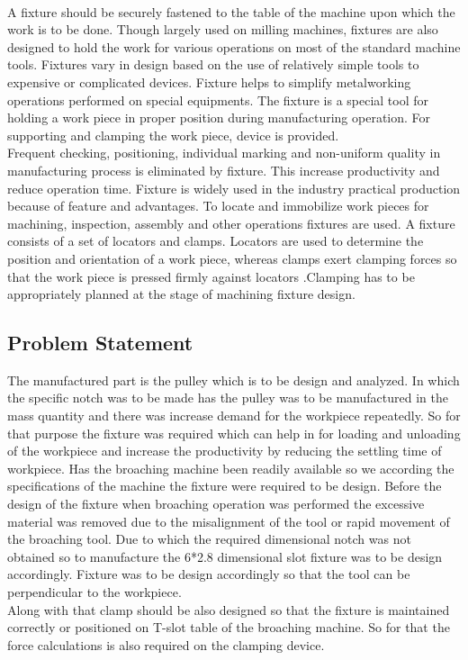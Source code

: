 \documentclass[16pt,a4paper]{article}
\begin{document}
\\ A fixture should be securely fastened to the table of the machine upon which the work is to be done. Though largely used on milling machines, fixtures are also designed to hold the work for various operations on most of the standard machine tools. Fixtures vary in design based on the use of relatively simple tools to expensive or complicated devices. Fixture helps to simplify metalworking operations performed on special equipments. The fixture is a special tool for holding a work piece in proper position during manufacturing operation. For supporting and clamping the work piece, device is provided.
\\Frequent checking, positioning, individual marking and non-uniform quality in manufacturing process is eliminated by fixture. This increase productivity and reduce operation time. Fixture is widely used in the industry practical production because of feature and advantages. To locate and immobilize work pieces for machining, inspection, assembly and other operations fixtures are used. A fixture consists of a set of locators and clamps. Locators are used to determine the position and orientation of a work piece, whereas clamps exert clamping forces so that the work piece is pressed firmly against locators .Clamping has to be appropriately planned at the stage of machining fixture design.

\subsection{Problem Statement}
The manufactured part is the pulley which is to be design and analyzed. In which the specific notch was to be made has the pulley was to be manufactured in the mass quantity and there was increase demand for the workpiece repeatedly. So for that purpose the fixture was required which can help in for loading and unloading of the workpiece and increase the productivity by reducing the settling time of workpiece. Has the broaching machine been readily available so we according the specifications of the machine the fixture were required to be design. Before the design of the fixture when broaching operation was performed the excessive material was removed due to the misalignment of the tool or rapid movement of the broaching tool. Due to which the required dimensional notch was not obtained so to manufacture the 6*2.8 dimensional slot fixture was to be design accordingly. Fixture was to be design accordingly so that the tool can be perpendicular to the workpiece.
\\Along with that clamp should be also designed so that the fixture is maintained correctly or positioned on T-slot table of the broaching machine. So for that the force calculations is also required on the clamping device.
\end{document}
